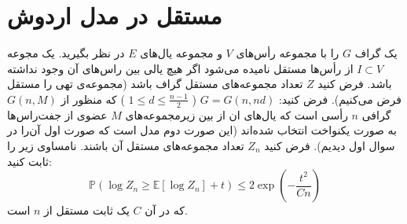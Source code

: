 \section{مستقل در مدل اردوش}
یک گراف 
$G$
را با مجموعه رأس‌های 
$V$
و مجموعه یال‌های 
$E$
در نظر بگیرید. یک مجوعه 
$I \subset V$
از رأس‌‌ها مستقل نامیده می‌شود اگر هیچ یالی بین راس‌های آن وجود نداشته باشد. فرض کنید 
$Z$
تعداد مجموعه‌های مستقل گراف باشد (مجموعه‌ی تهی را مستقل فرض می‌کنیم). فرض کنید:
$G=G(n, nd)$
(
$1\leq d\leq \frac{n-1}{2}$
)
که منظور از
$G(n,M)$
گرافی 
$n$ 
رأسی است که یال‌های ان از بین زیرمجموعه‌های
$M$
 عضوی از جفت‌راس‌ها به صورت یکنواخت انتخاب شده‌اند (این صورت دوم مدل 
است که صورت اول آن‌را در سوال اول دیدیم). فرض کنید
$Z_n$
تعداد مجموعه‌های مستقل آن باشند. نامساوی زیر را ثابت کنید:
$$\mathbb{P}\left(\log Z_{n} \geq \mathbb{E}\left[\log Z_{n}\right]+t\right) \leq 2 \exp \left(-\frac{t^{2}}{C n}\right)$$
که در آن 
$C$
یک ثابت مستقل از 
$n$
است.